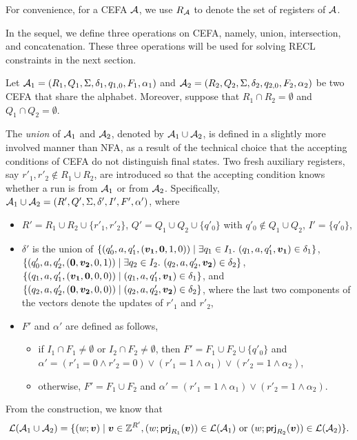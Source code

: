 
For convenience, for a CEFA $\mathcal{A}$, we use $R_{\mathcal{A}}$ to denote the set of registers of $\mathcal{A}$. 

In the sequel, we define three operations on CEFA, namely, union, intersection, and concatenation. These three operations will be used for solving RECL constraints in the next section. 

Let $\mathcal{A}_1 = (R_1, Q_1, \Sigma, \delta_1, q_{1,0}, F_1, \alpha_1)$ and  $\mathcal{A}_2 = (R_2, Q_2, \Sigma, \delta_2, q_{2,0}, F_2, \alpha_2)$ be two CEFA that share the alphabet. 
Moreover, suppose that $R_1 \cap R_2 = \emptyset$ and $Q_1 \cap Q_2 = \emptyset$. 

The \emph{union} of $\mathcal{A}_1$ and $\mathcal{A}_2$, denoted by $\mathcal{A}_1 \cup \mathcal{A}_2$, is defined in a slightly more involved manner than NFA, as a result of the technical choice that the accepting conditions of CEFA do not distinguish final states. Two fresh auxiliary registers, say $r'_1,r'_2 \not \in R_1 \cup R_2$, are introduced so that the accepting condition knows whether a run is from $\mathcal{A}_1$ or from $\mathcal{A}_2$. Specifically, $\mathcal{A}_1 \cup \mathcal{A}_2 = (R', Q', \Sigma, \delta', I', F', \alpha')$, where 
\begin{itemize}
\item $R' = R_1 \cup R_2 \cup \{r'_1, r'_2\}$, $Q' = Q_1 \cup Q_2 \cup \{q'_0\}$ with $q'_0 \not \in Q_1 \cup Q_2$, $I' = \{q'_0\}$, 
\item $\delta'$ is the union of $\{(q'_0, a, q'_1, (\myvec{v_1}, \myvec{0}, 1,0)) \mid \exists q_1 \in I_1.\ (q_1, a, q'_1, \myvec{v_1}) \in \delta_1\}$, $\{(q'_0, a, q'_2, (\myvec{0}, \myvec{v_2}, 0, 1)) \mid \exists q_2 \in I_2.\ (q_2, a, q'_2, \myvec{v_2}) \in \delta_2\}$, $\{(q_1, a, q'_1, (\myvec{v_1}, \myvec{0}, 0, 0)) \mid (q_1, a, q'_1, \myvec{v_1}) \in \delta_1\}$, and $\{(q_2, a, q'_2, (\myvec{0}, \myvec{v_2}, 0, 0)) \mid (q_2, a, q'_2, \myvec{v_2}) \in \delta_2\}$, where the last two components of the vectors denote the updates of $r'_1$ and $r'_2$, 

\item $F'$ and $\alpha'$ are defined as follows, 
\begin{itemize}
\item if $I_1 \cap F_1 \neq \emptyset$ or $I_2 \cap F_2 \neq \emptyset$, then $F' = F_1 \cup F_2 \cup \{q'_0\}$ and $\alpha' = (r'_1 = 0 \wedge r'_2 = 0) \vee (r'_1=1 \wedge \alpha_1) \vee (r'_2=1 \wedge \alpha_2)$, 
%
\item otherwise, $F'=F_1 \cup F_2$ and $\alpha' = (r'_1=1 \wedge \alpha_1) \vee (r'_2=1 \wedge \alpha_2)$.
\end{itemize}
\end{itemize}
From the construction, we know that 
$$\Lang(\aut_1 \cup \aut_2) = \{(w; \myvec{v}) \mid \myvec{v} \in \Int^{R'}, (w; \prj_{R_1}(\myvec{v})) \in \Lang(\aut_1) \mbox{ or } (w; \prj_{R_2}(\myvec{v})) \in \Lang(\aut_2)\}.$$ 

